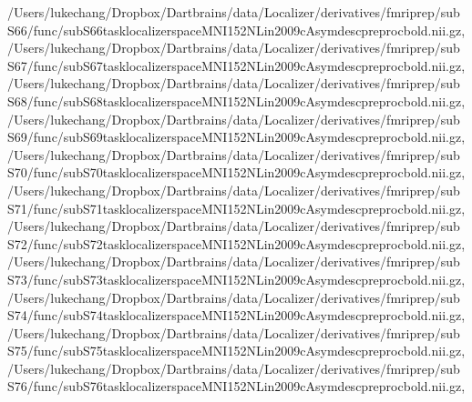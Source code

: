 \documentclass[letterpaper,10pt,english]{sphinxmanual}
\begin{document}
\begin{sphinxVerbatim}[commandchars=\\\{\}]
 \PYGZsq{}/Users/lukechang/Dropbox/Dartbrains/data/Localizer/derivatives/fmriprep/sub\PYGZhy{}S66/func/sub\PYGZhy{}S66\PYGZus{}task\PYGZhy{}localizer\PYGZus{}space\PYGZhy{}MNI152NLin2009cAsym\PYGZus{}desc\PYGZhy{}preproc\PYGZus{}bold.nii.gz\PYGZsq{},
 \PYGZsq{}/Users/lukechang/Dropbox/Dartbrains/data/Localizer/derivatives/fmriprep/sub\PYGZhy{}S67/func/sub\PYGZhy{}S67\PYGZus{}task\PYGZhy{}localizer\PYGZus{}space\PYGZhy{}MNI152NLin2009cAsym\PYGZus{}desc\PYGZhy{}preproc\PYGZus{}bold.nii.gz\PYGZsq{},
 \PYGZsq{}/Users/lukechang/Dropbox/Dartbrains/data/Localizer/derivatives/fmriprep/sub\PYGZhy{}S68/func/sub\PYGZhy{}S68\PYGZus{}task\PYGZhy{}localizer\PYGZus{}space\PYGZhy{}MNI152NLin2009cAsym\PYGZus{}desc\PYGZhy{}preproc\PYGZus{}bold.nii.gz\PYGZsq{},
 \PYGZsq{}/Users/lukechang/Dropbox/Dartbrains/data/Localizer/derivatives/fmriprep/sub\PYGZhy{}S69/func/sub\PYGZhy{}S69\PYGZus{}task\PYGZhy{}localizer\PYGZus{}space\PYGZhy{}MNI152NLin2009cAsym\PYGZus{}desc\PYGZhy{}preproc\PYGZus{}bold.nii.gz\PYGZsq{},
 \PYGZsq{}/Users/lukechang/Dropbox/Dartbrains/data/Localizer/derivatives/fmriprep/sub\PYGZhy{}S70/func/sub\PYGZhy{}S70\PYGZus{}task\PYGZhy{}localizer\PYGZus{}space\PYGZhy{}MNI152NLin2009cAsym\PYGZus{}desc\PYGZhy{}preproc\PYGZus{}bold.nii.gz\PYGZsq{},
 \PYGZsq{}/Users/lukechang/Dropbox/Dartbrains/data/Localizer/derivatives/fmriprep/sub\PYGZhy{}S71/func/sub\PYGZhy{}S71\PYGZus{}task\PYGZhy{}localizer\PYGZus{}space\PYGZhy{}MNI152NLin2009cAsym\PYGZus{}desc\PYGZhy{}preproc\PYGZus{}bold.nii.gz\PYGZsq{},
 \PYGZsq{}/Users/lukechang/Dropbox/Dartbrains/data/Localizer/derivatives/fmriprep/sub\PYGZhy{}S72/func/sub\PYGZhy{}S72\PYGZus{}task\PYGZhy{}localizer\PYGZus{}space\PYGZhy{}MNI152NLin2009cAsym\PYGZus{}desc\PYGZhy{}preproc\PYGZus{}bold.nii.gz\PYGZsq{},
 \PYGZsq{}/Users/lukechang/Dropbox/Dartbrains/data/Localizer/derivatives/fmriprep/sub\PYGZhy{}S73/func/sub\PYGZhy{}S73\PYGZus{}task\PYGZhy{}localizer\PYGZus{}space\PYGZhy{}MNI152NLin2009cAsym\PYGZus{}desc\PYGZhy{}preproc\PYGZus{}bold.nii.gz\PYGZsq{},
 \PYGZsq{}/Users/lukechang/Dropbox/Dartbrains/data/Localizer/derivatives/fmriprep/sub\PYGZhy{}S74/func/sub\PYGZhy{}S74\PYGZus{}task\PYGZhy{}localizer\PYGZus{}space\PYGZhy{}MNI152NLin2009cAsym\PYGZus{}desc\PYGZhy{}preproc\PYGZus{}bold.nii.gz\PYGZsq{},
 \PYGZsq{}/Users/lukechang/Dropbox/Dartbrains/data/Localizer/derivatives/fmriprep/sub\PYGZhy{}S75/func/sub\PYGZhy{}S75\PYGZus{}task\PYGZhy{}localizer\PYGZus{}space\PYGZhy{}MNI152NLin2009cAsym\PYGZus{}desc\PYGZhy{}preproc\PYGZus{}bold.nii.gz\PYGZsq{},
 \PYGZsq{}/Users/lukechang/Dropbox/Dartbrains/data/Localizer/derivatives/fmriprep/sub\PYGZhy{}S76/func/sub\PYGZhy{}S76\PYGZus{}task\PYGZhy{}localizer\PYGZus{}space\PYGZhy{}MNI152NLin2009cAsym\PYGZus{}desc\PYGZhy{}preproc\PYGZus{}bold.nii.gz\PYGZsq{},

\end{sphinxVerbatim}
\end{document}
